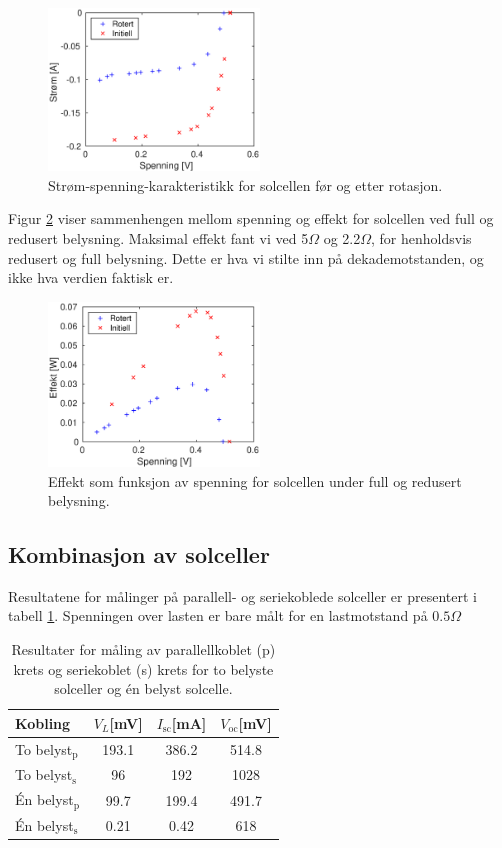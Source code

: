 \documentclass[a4paper,11pt, twocolumn]{article}
\begin{document}
\begin{figure}[!ht]
	\includegraphics[width = 0.5\textwidth]{matlab/LAB/currentVoltageRotated.eps}
	\caption{Strøm-spenning-karakteristikk for solcellen før og etter rotasjon.}
	\label{fig:currentVoltageRotation}
\end{figure}

Figur \ref{fig:effekt} viser sammenhengen mellom spenning og effekt for solcellen ved full og redusert belysning. Maksimal effekt fant vi ved 5$\Omega$ og 2.2$\Omega$, for henholdsvis redusert og full belysning. Dette er hva vi stilte inn på dekademotstanden, og ikke hva verdien faktisk er. 
\begin{figure}[!ht]
	\includegraphics[width = 0.5\textwidth]{matlab/LAB/optimalBelastning.eps}
	\caption{Effekt som funksjon av spenning for solcellen under full og redusert belysning.}
	\label{fig:effekt}
\end{figure}

\subsection{Kombinasjon av solceller}
Resultatene for målinger på parallell- og seriekoblede solceller er presentert i tabell \ref{tab:serieParallell}. Spenningen over lasten er bare målt for en lastmotstand på $0.5\Omega$

\begin{table}[!ht]
	\caption{Resultater for måling av parallellkoblet (p) krets og seriekoblet (s) krets for to belyste solceller og \'en belyst solcelle.}
	\label{tab:serieParallell}
	\begin{tabular}{lccc}
		\toprule
		\toprule
		Kobling & $V_L$[mV]  & $I_\text{sc}$[mA] & $V_\text{oc}$[mV]\\
		\hline
		To belyst$_\text{p}$ & 193.1  & 386.2 & 514.8\\
		To belyst$_\text{s}$ &  96  & 192 & 1028\\
		\'En belyst$_\text{p}$ &  99.7  & 199.4 & 491.7\\
		\'En belyst$_\text{s}$ &  0.21  & 0.42 & 618\\
		\toprule
	\end{tabular}
\end{table}
\end{document}
